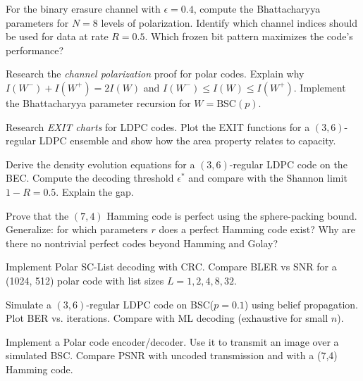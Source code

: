 \begin{exercise}[Intermediate]
For the binary erasure channel with $\epsilon = 0.4$, compute the Bhattacharyya parameters for $N = 8$ levels of polarization. Identify which channel indices should be used for data at rate $R = 0.5$. Which frozen bit pattern maximizes the code's performance?
\end{exercise}

\begin{exercise}[Challenge]
Research the \emph{channel polarization} proof for polar codes. Explain why $I(W^-)+I(W^+) = 2I(W)$ and $I(W^-) \le I(W) \le I(W^+)$. Implement the Bhattacharyya parameter recursion for $W = \text{BSC}(p)$.
\end{exercise}

\begin{exercise}[Challenge]
Research \emph{EXIT charts} for LDPC codes. Plot the EXIT functions for a $(3,6)$-regular LDPC ensemble and show how the area property relates to capacity.
\end{exercise}

\begin{exercise}[Challenge]
Derive the density evolution equations for a $(3,6)$-regular LDPC code on the BEC. Compute the decoding threshold $\epsilon^*$ and compare with the Shannon limit $1 - R = 0.5$. Explain the gap.
\end{exercise}

\begin{exercise}[Challenge]
Prove that the $(7,4)$ Hamming code is perfect using the sphere-packing bound. Generalize: for which parameters $r$ does a perfect Hamming code exist? Why are there no nontrivial perfect codes beyond Hamming and Golay?
\end{exercise}

\begin{exercise}[Challenge]
Implement Polar SC-List decoding with CRC. Compare BLER vs SNR for a (1024, 512) polar code with list sizes $L=1, 2, 4, 8, 32$.
\end{exercise}

\begin{exercise}[Computational]
Simulate a $(3,6)$-regular LDPC code on BSC($p=0.1$) using belief propagation. Plot BER vs. iterations. Compare with ML decoding (exhaustive for small $n$).
\end{exercise}

\begin{exercise}[Computational]
Implement a Polar code encoder/decoder. Use it to transmit an image over a simulated BSC. Compare PSNR with uncoded transmission and with a (7,4) Hamming code.
\end{exercise}


